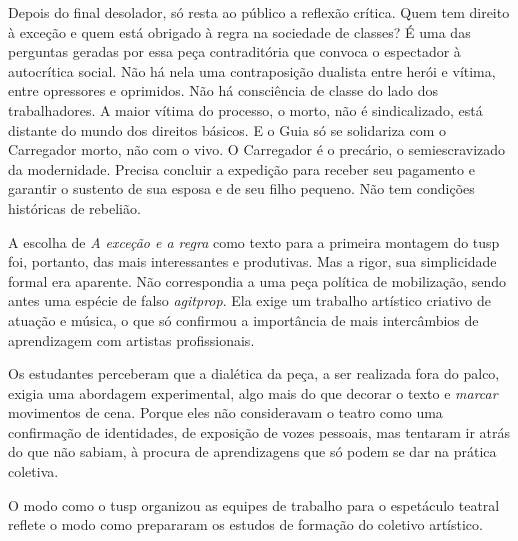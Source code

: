 Depois do final desolador, só resta ao público a reflexão crítica.
Quem tem direito à exceção e quem está obrigado à regra na sociedade de
classes? É uma das perguntas geradas por essa peça contraditória que
convoca o espectador à autocrítica social. Não há nela uma contraposição
dualista entre herói e vítima, entre opressores e oprimidos. Não há
consciência de classe do lado dos trabalhadores. A maior vítima do
processo, o morto, não é sindicalizado, está distante do mundo dos
direitos básicos. E o Guia só se solidariza com o Carregador morto, não
com o vivo. O Carregador é o precário, o semiescravizado da
modernidade. Precisa concluir a expedição para receber seu pagamento e
garantir o sustento de sua esposa e de seu filho pequeno. Não tem
condições históricas de rebelião.

A escolha de {\it A exceção e a regra} como texto para a primeira
montagem do {\sc tusp} foi, portanto, das mais interessantes e produtivas. Mas
a rigor, sua simplicidade formal era aparente. Não correspondia a uma
peça política de mobilização, sendo antes uma espécie de falso
{\it agitprop}. Ela exige um trabalho artístico criativo de atuação e
música, o que só confirmou a importância de mais intercâmbios de
aprendizagem com artistas profissionais.

Os estudantes perceberam que a dialética da peça, a ser realizada fora
do palco, exigia uma abordagem experimental, algo mais do que decorar o
texto e {\it marcar} movimentos de cena. Porque eles não consideravam o
teatro como uma confirmação de identidades, de exposição de vozes pessoais,
mas tentaram ir atrás do que não sabiam, à procura de aprendizagens que só
podem se dar na prática coletiva.

\subject{Formação da equipe: artistas-\\-pesquisadores}

O modo como o {\sc tusp} organizou as equipes de trabalho para o espetáculo
teatral reflete o modo como prepararam os estudos de formação do
coletivo artístico.


